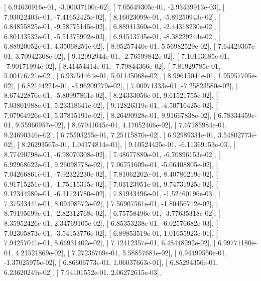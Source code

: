 \documentclass{article}
\begin{document}
       [  6.94630916e-01,  -3.00037100e-02],
       [  7.05649305e-01,  -2.93439913e-03],
       [  7.93022403e-01,  -7.41652425e-02],
       [  8.16023099e-01,  -5.89250943e-02],
       [  6.84855825e-01,  -9.58775145e-02],
       [  6.88941360e-01,  -2.44318230e-02],
       [  6.80133532e-01,  -5.51375902e-03],
       [  6.94513745e-01,  -8.38229244e-02],
       [  6.88920052e-01,   4.35068251e-02],
       [  8.95257440e-01,   5.56982529e-02],
       [  7.64429367e-01,   3.70942308e-02],
       [  9.12092944e-01,  -2.76599842e-02],
       [  7.10113685e-01,  -7.90171994e-02],
       [  8.41454414e-01,  -7.79844366e-02],
       [  7.81929785e-01,   5.00176721e-02],
       [  6.93754464e-01,   5.01145068e-02],
       [  8.99615044e-01,   1.95957705e-02],
       [  6.82144221e-01,  -3.96209279e-02],
       [  7.00971333e-01,  -7.25823580e-02],
       [  8.67422876e-01,  -5.80997861e-02],
       [  8.24333056e-01,   9.61521755e-02],
       [  7.03801988e-01,   5.23318641e-02],
       [  9.12826319e-01,  -4.50716425e-02],
       [  7.07964926e-01,   5.37815191e-02],
       [  8.26490928e-01,   9.91667838e-02],
       [  6.78334459e-01,   9.55960957e-02],
       [  8.67941045e-01,   4.17052466e-02],
       [  7.67185984e-01,   9.24690346e-02],
       [  6.75503255e-01,   7.25115870e-02],
       [  6.92989331e-01,   3.54802773e-02],
       [  8.26293567e-01,   1.04174814e-01],
       [  9.10524425e-01,  -6.11369153e-03],
       [  8.77490798e-01,  -6.98070308e-02],
       [  7.48677880e-01,  -6.70896153e-02],
       [  6.92968622e-01,   9.26098778e-02],
       [  7.06751609e-01,  -5.06408805e-02],
       [  7.04266861e-01,  -7.92322230e-02],
       [  7.81062202e-01,   8.40786219e-02],
       [  6.91715251e-01,  -1.75115315e-02],
       [  7.03123951e-01,   9.74731925e-02],
       [  9.12344980e-01,  -6.31724780e-02],
       [  7.81943496e-01,  -1.52460196e-03],
       [  7.37533441e-01,   8.09408572e-02],
       [  7.56907561e-01,  -1.80456712e-02],
       [  8.79195699e-01,  -2.82312768e-02],
       [  6.75758496e-01,  -3.77635318e-02],
       [  8.35952426e-01,   2.34769105e-02],
       [  6.85353238e-01,  -6.02576682e-03],
       [  7.02305873e-01,  -3.54153776e-02],
       [  6.89853519e-01,   1.01655923e-01],
       [  7.94257041e-01,   8.66931402e-02],
       [  7.12412357e-01,   6.48448292e-02],
       [  6.99771180e-01,   4.21521869e-02],
       [  7.27236769e-01,   5.58857681e-02],
       [  6.94499550e-01,  -1.37025975e-02],
       [  6.86606773e-01,   1.06037663e-01],
       [  6.85294356e-01,   6.23620249e-02],
       [  7.94101552e-01,   2.06272615e-03],
\end{document}
